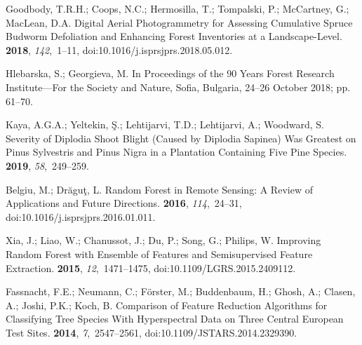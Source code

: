 \documentclass[remotesensing,article,accept,moreauthors,pdftex]{Definitions/mdpi}
\begin{document}
\begin{thebibliography}{999}
Goodbody, T.R.H.; Coops, N.C.; Hermosilla, T.; Tompalski, P.; McCartney, G.;
  MacLean, D.A.
\newblock Digital Aerial Photogrammetry for Assessing Cumulative Spruce Budworm
  Defoliation and Enhancing Forest Inventories at a Landscape-Level.
 {\bf 2018},
  {\em 142},~1--11, doi:10.1016/j.isprsjprs.2018.05.012.

Hlebarska, S.; Georgieva, M.
\newblock In Proceedings of the 90 Years Forest Research Institute---For
  the Society and Nature, Sofia, Bulgaria, 24--26 October 2018;   pp.
  61--70.

Kaya, A.G.A.; Yeltekin, {\c S}.; Lehtijarvi, T.D.; Lehtijarvi, A.; Woodward, S.
\newblock Severity of {{Diplodia}} Shoot Blight (Caused by {{Diplodia}}
  Sapinea) Was Greatest on {{Pinus}} Sylvestris and {{Pinus}} Nigra in a
  Plantation Containing Five Pine Species.
 {\bf 2019}, {\em 58},~249--259.

Belgiu, M.; Dr{\u a}gu{\c t}, L.
\newblock Random Forest in Remote Sensing: A Review of Applications and Future
  Directions.
 {\bf 2016},
  {\em 114},~24--31, doi:10.1016/j.isprsjprs.2016.01.011.

Xia, J.; Liao, W.; Chanussot, J.; Du, P.; Song, G.; Philips, W.
\newblock Improving {{Random Forest with Ensemble}} of {{Features}} and
  {{Semisupervised Feature Extraction}}.
 {\bf 2015}, {\em
  12},~1471--1475, doi:10.1109/LGRS.2015.2409112.

Fassnacht, F.E.; Neumann, C.; F{\"o}rster, M.; Buddenbaum, H.; Ghosh, A.;
  Clasen, A.; Joshi, P.K.; Koch, B.
\newblock Comparison of {{Feature Reduction Algorithms}} for {{Classifying Tree
  Species With Hyperspectral Data}} on {{Three Central European Test Sites}}.
 {\bf 2014}, {\em 7},~2547--2561, doi:10.1109/JSTARS.2014.2329390.


\end{thebibliography}
\end{document}
